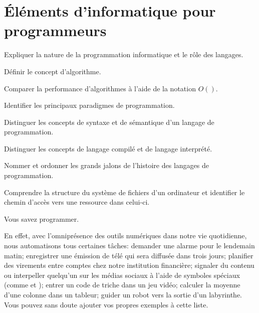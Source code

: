 
\chapter{Éléments d'informatique pour programmeurs}
\label{chap:informatique}

\begin{objectifs}
\item Expliquer la nature de la programmation informatique et le rôle
  des langages.
\item Définir le concept d'algorithme.
\item Comparer la performance d'algorithmes à l'aide de la notation
  $O()$.
\item Identifier les principaux paradigmes de programmation.
\item Distinguer les concepts de syntaxe et de sémantique d'un langage
  de programmation.
\item Distinguer les concepts de langage compilé et de langage
  interprété.
\item Nommer et ordonner les grands jalons de l'histoire des langages
  de programmation.
\item Comprendre la structure du système de fichiers d'un ordinateur
  et identifier le chemin d'accès vers une ressource dans celui-ci.
\end{objectifs}

Vous savez programmer.

En effet, avec l'omniprésence des outils numériques dans notre vie
quotidienne, nous automatisons tous certaines tâches:
demander une alarme pour le lendemain matin;
enregistrer une émission de télé qui sera diffusée dans trois jours;
planifier des virements entre comptes chez notre institution
  financière;
signaler du contenu ou interpeller quelqu'un sur les médias sociaux
  à l'aide de symboles spéciaux (comme \code{\#} et );
entrer un code de triche dans un jeu vidéo;
calculer la moyenne d'une colonne dans un tableur;
guider un robot vers la sortie d'un labyrinthe.
Vous pouvez sans doute ajouter vos propres exemples à cette liste.

